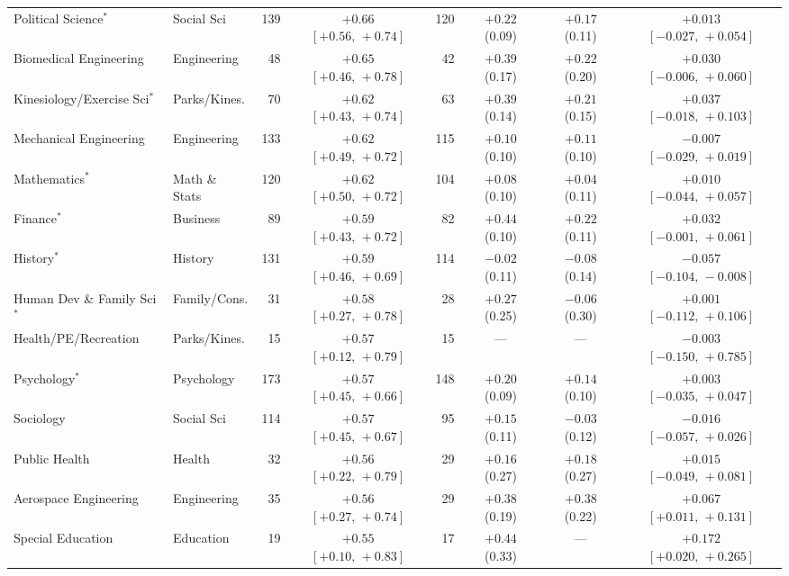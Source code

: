 \documentclass[11pt]{article}
\begin{document}
{\begin{longtable}{@{}>{\raggedright\arraybackslash}p{3.2cm}>{\raggedright\arraybackslash}p{1.9cm}rcrccc@{}}
Political Science$^{*}$ & Social Sci & 139 & ${+}0.66$ $[{+}0.56,\,{+}0.74]$ & 120 & ${+}0.22$ (0.09) & ${+}0.17$ (0.11) & ${+}0.013$ $[{-}0.027,\,{+}0.054]$ \\
Biomedical Engineering & Engineering & 48 & ${+}0.65$ $[{+}0.46,\,{+}0.78]$ & 42 & ${+}0.39$ (0.17) & ${+}0.22$ (0.20) & ${+}0.030$ $[{-}0.006,\,{+}0.060]$ \\
Kinesiology/\allowbreak Exercise Sci$^{*}$ & Parks/\allowbreak Kines. & 70 & ${+}0.62$ $[{+}0.43,\,{+}0.74]$ & 63 & ${+}0.39$ (0.14) & ${+}0.21$ (0.15) & ${+}0.037$ $[{-}0.018,\,{+}0.103]$ \\
Mechanical Engineering & Engineering & 133 & ${+}0.62$ $[{+}0.49,\,{+}0.72]$ & 115 & ${+}0.10$ (0.10) & ${+}0.11$ (0.10) & ${-}0.007$ $[{-}0.029,\,{+}0.019]$ \\
Mathematics$^{*}$ & Math \& Stats & 120 & ${+}0.62$ $[{+}0.50,\,{+}0.72]$ & 104 & ${+}0.08$ (0.10) & ${+}0.04$ (0.11) & ${+}0.010$ $[{-}0.044,\,{+}0.057]$ \\
Finance$^{*}$ & Business & 89 & ${+}0.59$ $[{+}0.43,\,{+}0.72]$ & 82 & ${+}0.44$ (0.10) & ${+}0.22$ (0.11) & ${+}0.032$ $[{-}0.001,\,{+}0.061]$ \\
History$^{*}$ & History & 131 & ${+}0.59$ $[{+}0.46,\,{+}0.69]$ & 114 & ${-}0.02$ (0.11) & ${-}0.08$ (0.14) & ${-}0.057$ $[{-}0.104,\,{-}0.008]$ \\
Human Dev \& Family Sci$^{*}$ & Family/\allowbreak Cons. & 31 & ${+}0.58$ $[{+}0.27,\,{+}0.78]$ & 28 & ${+}0.27$ (0.25) & ${-}0.06$ (0.30) & ${+}0.001$ $[{-}0.112,\,{+}0.106]$ \\
Health/\allowbreak PE/\allowbreak Recreation & Parks/\allowbreak Kines. & 15 & ${+}0.57$ $[{+}0.12,\,{+}0.79]$ & 15 & --- & --- & ${-}0.003$ $[{-}0.150,\,{+}0.785]$ \\
Psychology$^{*}$ & Psychology & 173 & ${+}0.57$ $[{+}0.45,\,{+}0.66]$ & 148 & ${+}0.20$ (0.09) & ${+}0.14$ (0.10) & ${+}0.003$ $[{-}0.035,\,{+}0.047]$ \\
Sociology & Social Sci & 114 & ${+}0.57$ $[{+}0.45,\,{+}0.67]$ & 95 & ${+}0.15$ (0.11) & ${-}0.03$ (0.12) & ${-}0.016$ $[{-}0.057,\,{+}0.026]$ \\
Public Health & Health & 32 & ${+}0.56$ $[{+}0.22,\,{+}0.79]$ & 29 & ${+}0.16$ (0.27) & ${+}0.18$ (0.27) & ${+}0.015$ $[{-}0.049,\,{+}0.081]$ \\
Aerospace Engineering & Engineering & 35 & ${+}0.56$ $[{+}0.27,\,{+}0.74]$ & 29 & ${+}0.38$ (0.19) & ${+}0.38$ (0.22) & ${+}0.067$ $[{+}0.011,\,{+}0.131]$ \\
Special Education & Education & 19 & ${+}0.55$ $[{+}0.10,\,{+}0.83]$ & 17 & ${+}0.44$ (0.33) & --- & ${+}0.172$ $[{+}0.020,\,{+}0.265]$ \\

\end{longtable}}
\end{document}
